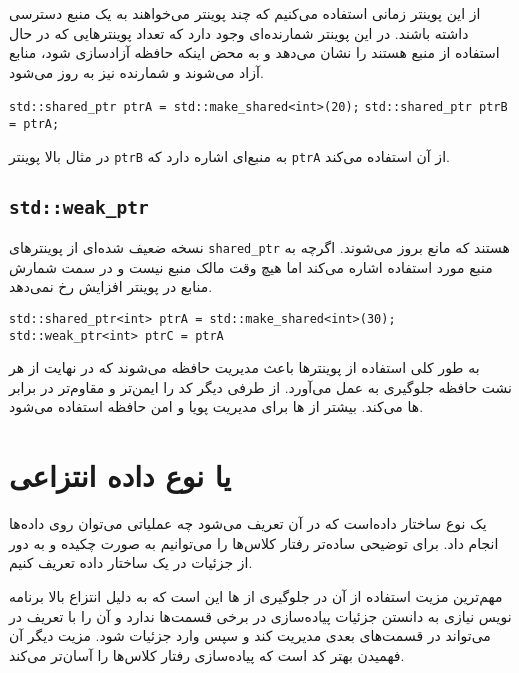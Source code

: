 \documentclass[a4paper]{article}
\begin{document}
از این پوینتر زمانی استفاده می‌کنیم که چند پوینتر می‌خواهند به یک منبع دسترسی
داشته باشند. در این پوینتر شمارنده‌ای وجود دارد که تعداد پوینتر‌هایی که در حال
استفاده از منبع هستند را نشان می‌دهد و به محض اینکه حافظه آزادسازی شود، منابع
آزاد می‌شوند و شمارنده نیز به روز می‌شود.

\begin{LTR}
    \texttt{std::shared\_ptr ptrA = std::make\_shared<int>(20);}
    \texttt{std::shared\_ptr ptrB = ptrA;}
\end{LTR}

در مثال بالا پوینتر \texttt{ptrB} به منبع‌ای اشاره دارد که \texttt{ptrA} از آن
استفاده می‌کند.

\subsection{\texttt{\large std::weak\_ptr}}

نسخه ضعیف شده‌ای از پوینتر‌های \texttt{shared\_ptr} هستند که مانع بروز
 می‌شوند. اگرچه به منبع مورد استفاده اشاره می‌کند اما هیچ وقت
مالک منبع نیست و در سمت شمارش منابع در پوینتر افزایش رخ نمی‌دهد.

\begin{LTR}
    \texttt{std::shared\_ptr<int> ptrA = std::make\_shared<int>(30);}    
    \texttt{std::weak\_ptr<int> ptrC = ptrA}
\end{LTR}

به طور کلی استفاده از پوینتر‌ها باعث مدیریت حافظه می‌شوند که در نهایت از هر نشت
حافظه جلوگیری به عمل می‌آورد. از طرفی دیگر کد را ایمن‌تر و مقاوم‌تر در برابر
ها می‌کند. بیشتر از ها برای مدیریت پویا و امن حافظه
استفاده می‌شود.

\section{ یا نوع داده انتزاعی}

یک نوع ساختار داده‌است که در آن تعریف می‌شود چه عملیاتی می‌توان روی داده‌ها
انجام داد. برای توضیحی ساده‌تر رفتار کلاس‌ها را می‌توانیم به صورت چکیده و به دور
از جزئیات در یک ساختار داده تعریف کنیم.

مهم‌ترین مزیت استفاده از آن در جلوگیری از ها این است که به دلیل
انتزاع بالا برنامه نویس نیازی به دانستن جزئیات پیاده‌سازی در برخی قسمت‌ها ندارد
و آن را با تعریف در  می‌تواند در قسمت‌های بعدی مدیریت کند و سپس وارد
جزئیات شود. مزیت دیگر آن فهمیدن بهتر کد است که پیاده‌سازی رفتار کلاس‌ها را
آسان‌تر می‌کند.
\end{document}

